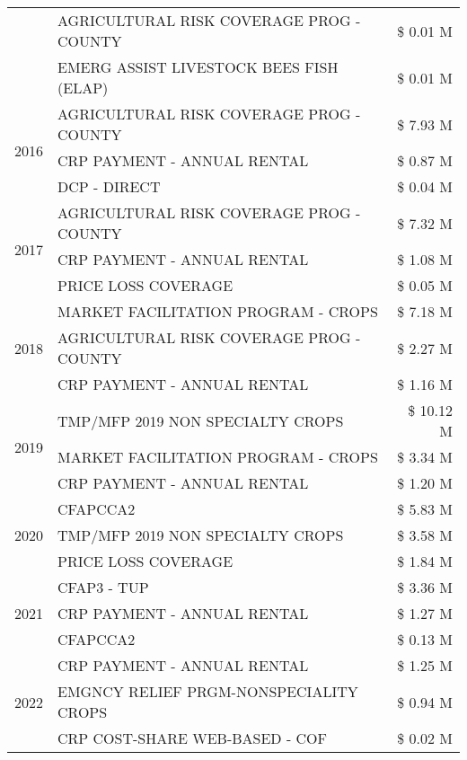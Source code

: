 \begin{tabular}{llr}
 & AGRICULTURAL RISK COVERAGE PROG - COUNTY & \$ 0.01 M \\
 & EMERG ASSIST LIVESTOCK BEES FISH (ELAP) & \$ 0.01 M \\
\cline{1-3}
\multirow[t]{3}{*}{2016} & AGRICULTURAL RISK COVERAGE PROG - COUNTY & \$ 7.93 M \\
 & CRP PAYMENT - ANNUAL RENTAL & \$ 0.87 M \\
 & DCP - DIRECT & \$ 0.04 M \\
\cline{1-3}
\multirow[t]{3}{*}{2017} & AGRICULTURAL RISK COVERAGE PROG - COUNTY & \$ 7.32 M \\
 & CRP PAYMENT - ANNUAL RENTAL & \$ 1.08 M \\
 & PRICE LOSS COVERAGE & \$ 0.05 M \\
\cline{1-3}
\multirow[t]{3}{*}{2018} & MARKET FACILITATION PROGRAM - CROPS & \$ 7.18 M \\
 & AGRICULTURAL RISK COVERAGE PROG - COUNTY & \$ 2.27 M \\
 & CRP PAYMENT - ANNUAL RENTAL & \$ 1.16 M \\
\cline{1-3}
\multirow[t]{3}{*}{2019} & TMP/MFP 2019 NON SPECIALTY CROPS & \$ 10.12 M \\
 & MARKET FACILITATION PROGRAM - CROPS & \$ 3.34 M \\
 & CRP PAYMENT - ANNUAL RENTAL & \$ 1.20 M \\
\cline{1-3}
\multirow[t]{3}{*}{2020} & CFAPCCA2 & \$ 5.83 M \\
 & TMP/MFP 2019 NON SPECIALTY CROPS & \$ 3.58 M \\
 & PRICE LOSS COVERAGE & \$ 1.84 M \\
\cline{1-3}
\multirow[t]{3}{*}{2021} & CFAP3 - TUP & \$ 3.36 M \\
 & CRP PAYMENT - ANNUAL RENTAL & \$ 1.27 M \\
 & CFAPCCA2 & \$ 0.13 M \\
\cline{1-3}
\multirow[t]{3}{*}{2022} & CRP PAYMENT - ANNUAL RENTAL & \$ 1.25 M \\
 & EMGNCY RELIEF PRGM-NONSPECIALITY CROPS & \$ 0.94 M \\
 & CRP COST-SHARE WEB-BASED - COF & \$ 0.02 M \\
\cline{1-3}
\bottomrule
\end{tabular}
